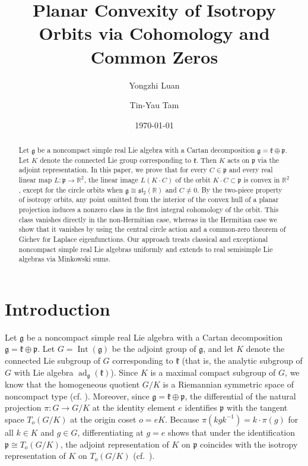 \documentclass[11pt,reqno]{amsart}
\title[Planar convexity of isotropy orbits]{Planar Convexity of Isotropy Orbits via Cohomology and Common Zeros}
\author{Yongzhi Luan}
\author{Tin-Yau Tam}
\date{\today}
\theoremstyle{remark}
\newcommand{\gfr}{\mathfrak g}
\newcommand{\kfr}{\mathfrak k}
\newcommand{\pfr}{\mathfrak p}
\begin{document}
\begin{abstract}
Let $\mathfrak{g}$ be a noncompact simple real Lie algebra with a Cartan decomposition $\mathfrak{g}=\mathfrak{k}\oplus\mathfrak{p}$. Let $K$ denote the connected Lie group corresponding to $\mathfrak{k}$. Then $K$ acts on $\mathfrak{p}$ via the adjoint representation. In this paper, we prove that for every $C\in\mathfrak{p}$ and every real linear map $L:\mathfrak{p}\to\mathbb{R}^2$, the linear image $L(K\cdot C)$ of the orbit $K\cdot C\subset\mathfrak{p}$ is convex in $\mathbb{R}^2$, except for the circle orbits when $\mathfrak{g}\cong\mathfrak{sl}_2(\mathbb{R})$ and $C\ne0$. By the two-piece property of isotropy orbits, any point omitted from the interior of the convex hull of a planar projection induces a nonzero class in the first integral cohomology of the orbit. This class vanishes directly in the non-Hermitian case, whereas in the Hermitian case we show that it vanishes by using the central circle action and a common-zero theorem of Gichev for Laplace eigenfunctions. Our approach treats classical and exceptional noncompact simple real Lie algebras uniformly and extends to real semisimple Lie algebras via Minkowski sums.
\end{abstract}
\maketitle

\tableofcontents


\section{Introduction}\label{sec:introduction}
Let $\gfr$ be a noncompact simple real Lie algebra with a Cartan
decomposition $\gfr=\kfr\oplus\pfr$. Let $G=\operatorname{Int}(\gfr)$
be the adjoint group of $\gfr$, and let $K$ denote the connected Lie
subgroup of $G$ corresponding to $\kfr$ (that is, the analytic subgroup
of $G$ with Lie algebra $\operatorname{ad}_{\gfr}(\kfr)$). Since $K$ is a maximal
compact subgroup of $G$, we know that the homogeneous quotient $G/K$ is a
Riemannian symmetric space of noncompact type (cf. \cite[Chapter~VI, Theorem~1.1, page~252]{Helgason1978}). Moreover, since
$\gfr=\kfr\oplus\pfr$, the differential of the natural projection
$\pi:G\to G/K$ at the identity element $e$ identifies $\pfr$ with the
tangent space $T_o(G/K)$ at the origin coset $o=eK$. Because
$\pi(kgk^{-1})=k\cdot\pi(g)$ for all $k\in K$ and $g\in G$,
differentiating at $g=e$ shows that under the identification
$\pfr\cong T_o(G/K)$, the adjoint representation of $K$ on $\pfr$
coincides with the isotropy representation of $K$ on $T_o(G/K)$
(cf.~\cite[Chapter~IV, Section~3, pages~209--215]{Helgason1978}).
\end{document}
